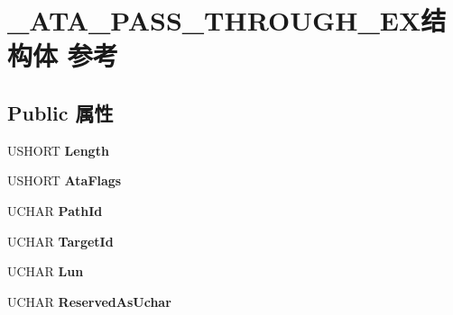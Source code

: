 \hypertarget{struct___a_t_a___p_a_s_s___t_h_r_o_u_g_h___e_x}{}\section{\+\_\+\+A\+T\+A\+\_\+\+P\+A\+S\+S\+\_\+\+T\+H\+R\+O\+U\+G\+H\+\_\+\+E\+X结构体 参考}
\label{struct___a_t_a___p_a_s_s___t_h_r_o_u_g_h___e_x}
\subsection*{Public 属性}
\begin{DoxyCompactItemize}
\item 
\mbox{\label{struct___a_t_a___p_a_s_s___t_h_r_o_u_g_h___e_x_a68dce2e08c2af5a522f8619248778e70}} 
U\+S\+H\+O\+RT {\bfseries Length}
\item 
\mbox{\label{struct___a_t_a___p_a_s_s___t_h_r_o_u_g_h___e_x_a7c3ea70d6fa60bdc854373ceef8e5aa2}} 
U\+S\+H\+O\+RT {\bfseries Ata\+Flags}
\item 
\mbox{\label{struct___a_t_a___p_a_s_s___t_h_r_o_u_g_h___e_x_aaff0b457057d9d727feaf5d3e5aa2106}} 
U\+C\+H\+AR {\bfseries Path\+Id}
\item 
\mbox{\label{struct___a_t_a___p_a_s_s___t_h_r_o_u_g_h___e_x_aa50f1d9d8d18aadb182c80e9906e827f}} 
U\+C\+H\+AR {\bfseries Target\+Id}
\item 
\mbox{\label{struct___a_t_a___p_a_s_s___t_h_r_o_u_g_h___e_x_aad011731a95dfa614d5305c3f0fbcefe}} 
U\+C\+H\+AR {\bfseries Lun}
\item 
\mbox{\label{struct___a_t_a___p_a_s_s___t_h_r_o_u_g_h___e_x_a95a1a386a4f251ff3aa826cf178df898}} 
U\+C\+H\+AR {\bfseries Reserved\+As\+Uchar}
\item 
\mbox{\label{struct___a_t_a___p_a_s_s___t_h_r_o_u_g_h___e_x_a00806c830475bcf82754fa8272b8664b}} 

\end{DoxyCompactItemize}

